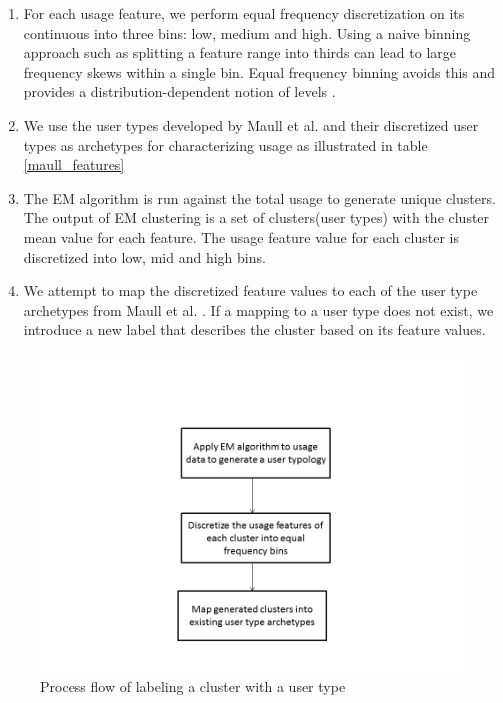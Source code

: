 \documentclass{acm_proc_article-sp}
\begin{document}
\begin{enumerate}

\item For each usage feature, we perform equal frequency discretization on its continuous into three bins: low, medium and high. Using a naive binning approach such as splitting a feature range into thirds can lead to large frequency skews within a single bin. Equal frequency binning avoids this and provides a distribution-dependent notion of levels \cite{han2006data}.  

\item We use the user types developed by Maull et al. \cite{maullunderstanding} and their discretized user types as archetypes for characterizing usage as illustrated in table \ref{maull_features}

\item The EM algorithm is run against the total usage to generate unique clusters. The output of EM clustering is a set of clusters(user types) with the cluster mean value for each feature. The usage feature value for each cluster is discretized into low, mid and high bins. 

\item We attempt to map the discretized feature values to each of the user type archetypes from Maull et al. \cite{maullunderstanding}. If a mapping to a user type does not exist, we introduce a new label that describes the cluster based on its feature values.


\end{enumerate}

\begin{figure}
\centering
\includegraphics[width=1 \linewidth]{./process_flow}
\caption{Process flow of labeling a cluster with a user type}
\label{fig:process_flow}
\end{figure}
\end{document}
